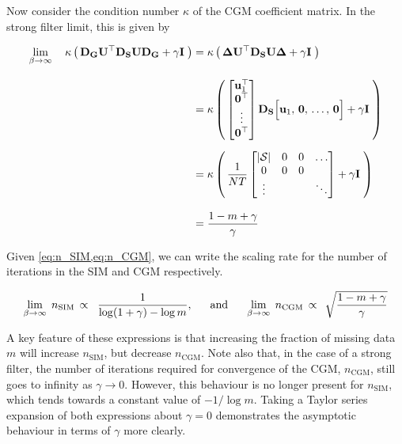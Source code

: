 Now consider the condition number $\kappa$ of the CGM coefficient matrix. In the strong filter limit, this is given by  

\begin{align}
    \lim_{\beta \rightarrow \infty} \quad \kappa \left(  \, \mathbf{D}_{\mathbf{G}} \mathbf{U}^\top \mathbf{D}_{\mathbf{S}} \mathbf{U} \mathbf{D}_{\mathbf{G}} + \gamma \mathbf{I} \; \right)  &= \kappa  \left(  \, \mathbf{\Delta} \mathbf{U}^\top \mathbf{D}_{\mathbf{S}} \mathbf{U} \mathbf{\Delta}  + \gamma \mathbf{I} \; \right) \notag \\[0.3cm]
    &= \kappa  \left(  \, 
    \begin{bmatrix} 
        \mathbf{u}_1^\top \\ 
        \mathbf{0}^\top \\
        \vdots \\ 
        \mathbf{0}^\top 
    \end{bmatrix} \mathbf{D}_{\mathbf{S}}  \Big[ \mathbf{u}_1, \, \mathbf{0}, \, \dots, \,\mathbf{0} \Big]
    + \gamma \mathbf{I} \; \right) \notag \\[0.2cm]
    &= \kappa  \left(  \, \frac{1}{NT}  \begin{bmatrix}
        |\mathcal{S}| & 0 & 0 & \dots \\
        0 & 0 & 0 &  \\
        \vdots & & & \ddots
    \end{bmatrix}   + \gamma \mathbf{I} \; \right) \notag \\[0.3cm]
    &= \frac{1 - m + \gamma}{\gamma}
\end{align}

Given \cref{eq:n_SIM,eq:n_CGM}, we can write the scaling rate for the number of iterations in the SIM and CGM respectively. 

\begin{equation}
    \label{eq:n_SFL}
    \lim_{\beta \rightarrow \infty} \;  n_\text{SIM} \, \propto \;\;  \frac{1}{\log(1 + \gamma) - \log m}, \;\; \quad \text{and} \quad \;\;  \lim_{\beta \rightarrow \infty} \;  n_\text{CGM} \, \propto \;\, \sqrt{\frac{1 - m + \gamma}{\gamma}}
\end{equation}


A key feature of these expressions is that increasing the fraction of missing data $m$ will increase $n_\text{SIM}$, but decrease $n_\text{CGM}$. Note also that, in the case of a strong filter, the number of iterations required for convergence of the CGM, $n_\text{CGM}$, still goes to infinity as $\gamma \rightarrow 0$. However, this behaviour is no longer present for $n_\text{SIM}$, which tends towards a constant value of $-1/\log m$. Taking a Taylor series expansion of both expressions about $\gamma=0$ demonstrates the asymptotic behaviour in terms of $\gamma$ more clearly. 

